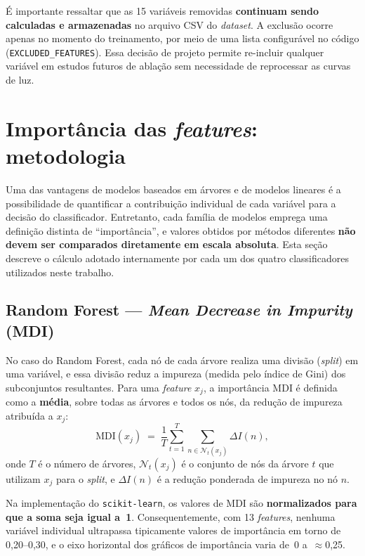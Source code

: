 \documentclass[msc]{on} %
\begin{document}
É importante ressaltar que as 15 variáveis removidas \textbf{continuam sendo calculadas e armazenadas} no arquivo CSV do \textit{dataset}. A exclusão ocorre apenas no momento do treinamento, por meio de uma lista configurável no código (\texttt{EXCLUDED\_FEATURES}). Essa decisão de projeto permite re-incluir qualquer variável em estudos futuros de ablação sem necessidade de reprocessar as curvas de luz.

\section{Importância das \textit{features}: metodologia}
\label{sec:feature_importance_metodologia}

Uma das vantagens de modelos baseados em árvores e de modelos lineares é a possibilidade de quantificar a contribuição individual de cada variável para a decisão do classificador. Entretanto, cada família de modelos emprega uma definição distinta de ``importância'', e valores obtidos por métodos diferentes \textbf{não devem ser comparados diretamente em escala absoluta}. Esta seção descreve o cálculo adotado internamente por cada um dos quatro classificadores utilizados neste trabalho.

\subsection{Random Forest --- \textit{Mean Decrease in Impurity} (MDI)}

No caso do Random Forest, cada nó de cada árvore realiza uma divisão (\textit{split}) em uma variável, e essa divisão reduz a impureza (medida pelo índice de Gini) dos subconjuntos resultantes. Para uma \textit{feature} $x_j$, a importância MDI é definida como a \textbf{média}, sobre todas as árvores e todos os nós, da redução de impureza atribuída a $x_j$:
%
\[
\text{MDI}(x_j) \;=\; \frac{1}{T}\sum_{t=1}^{T}\sum_{n \in \mathcal{N}_t(x_j)} \Delta I(n),
\]
%
onde $T$ é o número de árvores, $\mathcal{N}_t(x_j)$ é o conjunto de nós da árvore $t$ que utilizam $x_j$ para o \textit{split}, e $\Delta I(n)$ é a redução ponderada de impureza no nó $n$.

Na implementação do \texttt{scikit-learn}, os valores de MDI são \textbf{normalizados para que a soma seja igual a~1}. Consequentemente, com 13 \textit{features}, nenhuma variável individual ultrapassa tipicamente valores de importância em torno de 0,20--0,30, e o eixo horizontal dos gráficos de importância varia de~0 a~$\approx$0,25.
\end{document}
